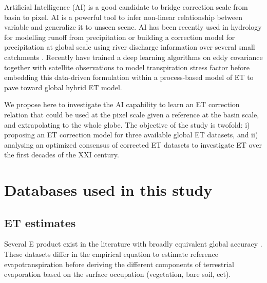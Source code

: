 \documentclass[draft]{agujournal2019}
\begin{document}
Artificial Intelligence (AI) is a good candidate to bridge correction scale from basin to pixel. AI is a powerful tool to infer non-linear relationship between variable and generalize it to unseen scene. AI has been recently used in hydrology for modelling runoff from precipitation \cite{Kratzert2018} or building a correction model for precipitation at global scale using river discharge information over several small catchments \cite{Beck2020}. Recently \cite{Koppa2022} have trained a deep learning algorithms on eddy covariance together with satellite observations to model transpiration stress factor before embedding this data-driven formulation within a process-based model of ET to pave toward global hybrid ET model.

We propose here to investigate the AI capability to learn an ET correction relation that could be used at the pixel scale given a reference at the basin scale, and extrapolating to the whole globe. The objective of the study is twofold: i) proposing an ET correction model for three available global ET datasets, and ii) analysing an optimized consensus of corrected ET datasets to investigate ET over the first decades of the XXI century. 













\section{Databases used in this study}
\subsection{ET estimates}
Several E product exist in the literature \cite{Mueller2011a,Zhang2017} with broadly equivalent global accuracy \cite{Michel2016,Miralles2016}. These datasets differ in the empirical equation to estimate reference evapotranspiration before deriving the different components of terrestrial evaporation based on the surface occupation (vegetation, bare soil, ect).
\end{document}
